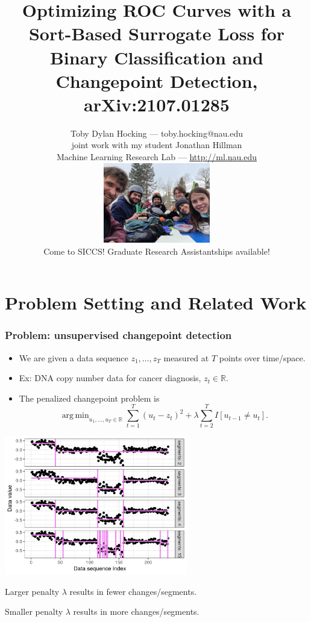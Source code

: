 \documentclass{beamer}
\DeclareMathOperator*{\argmin}{arg\,min}
\begin{document}
\title{Optimizing ROC Curves with a Sort-Based Surrogate Loss for Binary Classification and Changepoint Detection, arXiv:2107.01285}

\author{
  Toby Dylan Hocking --- toby.hocking@nau.edu\\ 
  joint work with my student Jonathan Hillman\\
  Machine Learning Research Lab --- \url{http://ml.nau.edu}\\
  \includegraphics[height=3.5cm]{2021-03-lab-ski-lunch} \\
  Come to SICCS! Graduate Research Assistantships available!
}

\date{}

\maketitle 

\section{Problem Setting and Related Work}

\begin{frame}
  \frametitle{Problem: unsupervised changepoint detection}
  \begin{itemize}
  \item We are given a data sequence $z_1,\dots,z_T$ measured at $T$
    points over time/space.
  \item Ex: DNA copy number data for cancer diagnosis, $z_t\in\mathbb R$.
  \item The penalized changepoint problem is
$$\argmin_{u_1,\dots,u_T\in\mathbb R} \sum_{t=1}^T (u_t - z_t)^2 + \lambda\sum_{t=2}^T I[u_{t-1} \neq u_t].$$
  \end{itemize}

  \parbox{0.6\textwidth}{
\includegraphics[width=0.6\textwidth]{figure-fn-not-monotonic-no-labels}
}
\parbox{0.3\textwidth}{
  Larger penalty $\lambda$ results in fewer changes/segments.

  \vskip 0.5in

  Smaller penalty $\lambda$ results in more changes/segments.
}

\end{frame}
\end{document}
